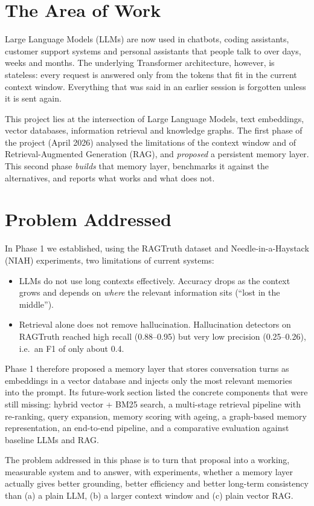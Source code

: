 
\section{The Area of Work}
Large Language Models (LLMs) are now used in chatbots, coding assistants, customer support systems and
personal assistants that people talk to over days, weeks and months. The underlying Transformer
architecture, however, is stateless: every request is answered only from the tokens that fit in the current
context window. Everything that was said in an earlier session is forgotten unless it is sent again.

This project lies at the intersection of Large Language Models, text embeddings, vector databases,
information retrieval and knowledge graphs. The first phase of the project (April 2026) analysed the
limitations of the context window and of Retrieval-Augmented Generation (RAG), and \emph{proposed} a
persistent memory layer. This second phase \emph{builds} that memory layer, benchmarks it against the
alternatives, and reports what works and what does not.

\section{Problem Addressed}
In Phase 1 we established, using the RAGTruth dataset and Needle-in-a-Haystack (NIAH) experiments, two
limitations of current systems:
\begin{itemize}[nosep]
  \item LLMs do not use long contexts effectively. Accuracy drops as the context grows and depends on
        \emph{where} the relevant information sits (``lost in the middle'').
  \item Retrieval alone does not remove hallucination. Hallucination detectors on RAGTruth reached high
        recall (0.88--0.95) but very low precision (0.25--0.26), i.e.\ an F1 of only about 0.4.
\end{itemize}
Phase 1 therefore proposed a memory layer that stores conversation turns as embeddings in a vector
database and injects only the most relevant memories into the prompt. Its future-work section listed the
concrete components that were still missing: hybrid vector + BM25 search, a multi-stage retrieval pipeline
with re-ranking, query expansion, memory scoring with ageing, a graph-based memory representation, an
end-to-end pipeline, and a comparative evaluation against baseline LLMs and RAG.

The problem addressed in this phase is to turn that proposal into a working, measurable system and to
answer, with experiments, whether a memory layer actually gives better grounding, better efficiency and
better long-term consistency than (a) a plain LLM, (b) a larger context window and (c) plain vector RAG.

